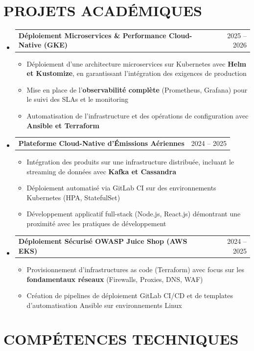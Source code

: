 \documentclass[letterpaper,10pt]{article}
\makeatletter
\newcommand{\resumeItem}[1]{
  \item\small{
    {#1 \vspace{-3pt}}
  }
}
\newcommand{\resumeProjectHeading}[2]{
    \item
    \begin{tabular*}{\textwidth}{l@{\extracolsep{\fill}}r}
      #1 & {\color{dark-grey}\small #2} \\
    \end{tabular*}\vspace{-6pt}
}
\newcommand{\resumeSubHeadingListStart}{\begin{itemize}[leftmargin=0in, label={}]}
\newcommand{\resumeSubHeadingListEnd}{\end{itemize}}
\newcommand{\resumeItemListStart}{\begin{itemize}}
\newcommand{\resumeItemListEnd}{\end{itemize}\vspace{0pt}}
\makeatother
\begin{document}
\section{PROJETS ACADÉMIQUES}
    \resumeSubHeadingListStart
             \resumeProjectHeading
          {\textbf{Déploiement Microservices \& Performance Cloud-Native (GKE)}}{2025 -- 2026}
          \resumeItemListStart
            \resumeItem{Déploiement d'une architecture microservices sur Kubernetes avec \textbf{Helm et Kustomize}, en garantissant l'intégration des exigences de production}
            \resumeItem{Mise en place de l'\textbf{observabilité complète} (Prometheus, Grafana) pour le suivi des SLAs et le monitoring}
            \resumeItem{Automatisation de l'infrastructure et des opérations de configuration avec \textbf{Ansible et Terraform}}
          \resumeItemListEnd
                 \resumeProjectHeading
          {\textbf{Plateforme Cloud-Native d'Émissions Aériennes}}{2024 -- 2025}
          \resumeItemListStart
            \resumeItem{Intégration des produits sur une infrastructure distribuée, incluant le streaming de données avec \textbf{Kafka et Cassandra}}
            \resumeItem{Déploiement automatisé via GitLab CI sur des environnements Kubernetes (HPA, StatefulSet)}
            \resumeItem{Développement applicatif full-stack (Node.js, React.js) démontrant une proximité avec les pratiques de développement}
          \resumeItemListEnd
                 \resumeProjectHeading
         {\textbf{Déploiement Sécurisé OWASP Juice Shop (AWS EKS)}}{2024 -- 2025}
          \resumeItemListStart
            \resumeItem{Provisionnement d'infrastructures as code (Terraform) avec focus sur les \textbf{fondamentaux réseaux} (Firewalls, Proxies, DNS, WAF)}
            \resumeItem{Création de pipelines de déploiement GitLab CI/CD et de templates d'automatisation Ansible sur environnements Linux}
          \resumeItemListEnd
               \resumeSubHeadingListEnd

\section{COMPÉTENCES TECHNIQUES}
\end{document}
